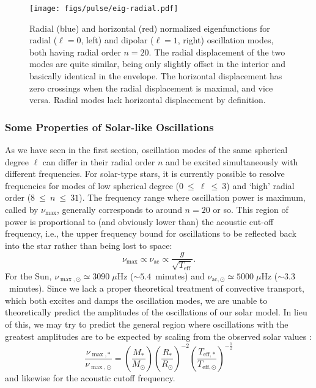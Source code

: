 \begin{figure}
    \centering
    \texttt{[image: figs/pulse/eig-radial.pdf]}%
    \caption[Eigenfunctions]{Radial (blue) and horizontal (red) normalized eigenfunctions for radial (${\ell=0}$, left) and dipolar (${\ell=1}$, right) oscillation modes, both having radial order ${n=20}$. 
    The radial displacement of the two modes are quite similar, being only slightly offset in the interior and basically identical in the envelope. 
    The horizontal displacement has zero crossings when the radial displacement is maximal, and vice versa. 
    Radial modes lack horizontal displacement by definition. 
    \label{fig:eigenfunctions}}
\end{figure}



\subsubsection*{Some Properties of Solar-like Oscillations}

As we have seen in the first section, oscillation modes of the same spherical degree $\ell$ can differ in their radial order $n$ and be excited simultaneously with different frequencies. 
For solar-type stars, it is currently possible to resolve frequencies for modes of low spherical degree (${0~\leq~\ell~\leq~3}$) and `high' radial order (${8~\leq~n~\leq~31}$). 
The frequency range where oscillation power is maximum, called by $\nu_{\max}$, generally corresponds to around ${n=20}$ or so. 
This region of power is proportional to (and obviously lower than) the acoustic cut-off frequency, i.e., the upper frequency bound for oscillations to be reflected back into the star rather than being lost to space: 
\begin{equation} \label{eq:numax}
    \nu_{\max} \propto \nu_{\text{ac}} \propto \frac{g}{\sqrt{T_{\text{eff}}}}.  %
\end{equation}
For the Sun, ${\nu_{\max,\odot} \simeq 3090\;\mu\text{Hz}}$ (${\sim 5.4}$~minutes) and ${\nu_{\text{ac},\odot} \simeq 5000\;\mu\text{Hz}}$ (${\sim 3.3}$~minutes). 
Since we lack a proper theoretical treatment of convective transport, which both excites and damps the oscillation modes, we are unable to theoretically predict the amplitudes of the oscillations of our solar model. 
In lieu of this, we may try to predict the general region where oscillations with the greatest amplitudes are to be expected by scaling from the observed solar values \citep[e.g.,][]{1995A&A...293...87K}:
\begin{equation}
    \frac{\nu_{\max,\ast}}{\nu_{\max,\odot}}
    =
    \left(
        \frac{M_\ast}{M_\odot}
    \right)
    \left(
        \frac{R_\ast}{R_\odot}
    \right)^{-2}
    \left(
        \frac{T_{\text{eff},\ast}}{T_{\text{eff},\odot}}
    \right)^{-\frac{1}{2}}
\end{equation}
and likewise for the acoustic cutoff frequency. 

